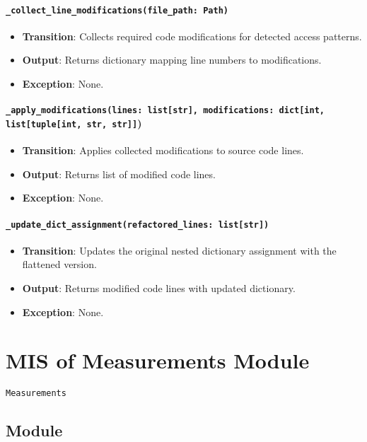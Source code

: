 \documentclass[12pt, titlepage]{article}
\begin{document}
\paragraph{\texttt{\_collect\_line\_modifications(file\_path: Path)}}
\begin{itemize}
\item \textbf{Transition}: Collects required code modifications for detected access patterns.
\item \textbf{Output}: Returns dictionary mapping line numbers to modifications.
\item \textbf{Exception}: None.
\end{itemize}

\paragraph{\texttt{\_apply\_modifications(lines: list[str], modifications: dict[int, list[tuple[int, str, str]]})}
\begin{itemize}
\item \textbf{Transition}: Applies collected modifications to source code lines.
\item \textbf{Output}: Returns list of modified code lines.
\item \textbf{Exception}: None.
\end{itemize}

\paragraph{\texttt{\_update\_dict\_assignment(refactored\_lines: list[str])}}
\begin{itemize}
\item \textbf{Transition}: Updates the original nested dictionary assignment with the flattened version.
\item \textbf{Output}: Returns modified code lines with updated dictionary.
\item \textbf{Exception}: None.
\end{itemize}




\section{MIS of Measurements Module} \label{mis:measure}

\texttt{Measurements}

\subsection{Module}
\end{document}
